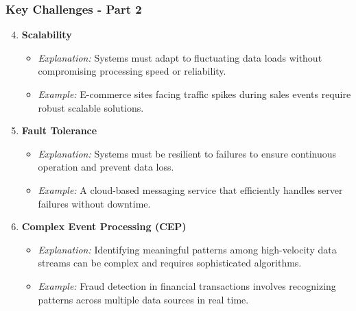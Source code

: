 \documentclass[aspectratio=169]{beamer}
\begin{document}
\begin{frame}[fragile]
    \frametitle{Key Challenges - Part 2}
    \begin{enumerate}
        \setcounter{enumi}{3} %
        \item \textbf{Scalability}
        \begin{itemize}
            \item \textit{Explanation:} Systems must adapt to fluctuating data loads without compromising processing speed or reliability.
            \item \textit{Example:} E-commerce sites facing traffic spikes during sales events require robust scalable solutions.
        \end{itemize}

        \item \textbf{Fault Tolerance}
        \begin{itemize}
            \item \textit{Explanation:} Systems must be resilient to failures to ensure continuous operation and prevent data loss.
            \item \textit{Example:} A cloud-based messaging service that efficiently handles server failures without downtime.
        \end{itemize}

        \item \textbf{Complex Event Processing (CEP)}
        \begin{itemize}
            \item \textit{Explanation:} Identifying meaningful patterns among high-velocity data streams can be complex and requires sophisticated algorithms.
            \item \textit{Example:} Fraud detection in financial transactions involves recognizing patterns across multiple data sources in real time.
        \end{itemize}
    \end{enumerate}
\end{frame}
\end{document}
